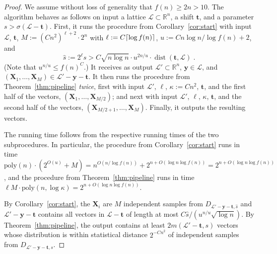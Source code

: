 \documentclass[11pt]{article}
\newcommand{\R}{\ensuremath{\mathbb{R}}}
\renewcommand{\vec}[1]{\ensuremath{\mathbf{#1}}}
\newcommand{\poly}{\mathrm{poly}}
\newcommand{\lat}{\mathcal{L}}
\DeclareMathOperator{\dist}{dist}
\DeclarePairedDelimiter\ceil{\lceil}{\rceil}
\begin{document}
\begin{proof}
We assume without loss of generality that $f(n) \geq 2n > 10$. The algorithm behaves as follows on input a lattice $\lat \subset \R^n$, a shift $\vec{t}$, and a parameter $s > \sigma(\lat - \vec{t})$. First, it runs the procedure from Corollary~\ref{cor:start} with input $\lat$, $\vec{t}$, $M := (Cn^2)^{\ell + 2} \cdot 2^n$ with $\ell :=  C\ceil{\log f(n)}$, $u := C n \log n/ \log f(n) + 2$, and 
\[
\hat{s} := 2^\ell s > C\sqrt{n \log n} \cdot u^{2n/u} \cdot \dist(\vec{t}, \lat)
\; .
\]
(Note that $u^{n/u} \leq f(n)^{C}$.) It receives as output $\lat' \subset \R^n$, $\vec{y} \in \lat$, and $(\vec{X}_1, \ldots, \vec{X}_M) \in \lat' - \vec{y} - \vec{t}$. It then runs the procedure from Theorem~\ref{thm:pipeline} \emph{twice}, first with input $\lat'$, $\ell$, $\kappa := Cn^2$, $\vec{t}$, and the first half of the vectors, $(\vec{X}_1, \ldots, \vec{X}_{M/2})$; and next with input $\lat'$, $\ell$, $\kappa$, $\vec{t}$, and the second half of the vectors, $(\vec{X}_{M/2+1}, \ldots, \vec{X}_{M})$. Finally, it outputs the resulting vectors.

The running time follows from the respective running times of the two subprocedures. In particular, the procedure from Corollary~\ref{cor:start} runs in time $\poly(n) \cdot (2^{O(u)} + M) =  n^{O(n/\log f(n))} + 2^{n+O(\log n \log f(n))} =  2^{n+O(\log n \log f(n))}$, and the procedure from Theorem~\ref{thm:pipeline} runs in time $\ell M \cdot \poly(n, \log \kappa) = 2^{n+O(\log n\log f(n))}$.

By Corollary~\ref{cor:start}, the $\vec{X}_i$ are $M$ independent samples from $D_{\lat' - \vec{y} - \vec{t}, \hat{s}}$  and $\lat' - \vec{y} - \vec{t}$ contains all vectors in $\lat - \vec{t}$ of length at most $C\hat{s} /(u^{n/u}\sqrt{ \log n})$. By Theorem~\ref{thm:pipeline}, the output contains at least $2m(\lat' - \vec{t}, s)$ vectors whose distribution is within statistical distance $2^{-Cn^2}$ of independent samples from $D_{\lat' - \vec{y} - \vec{t}, s}$. 


\end{proof}
\end{document}
